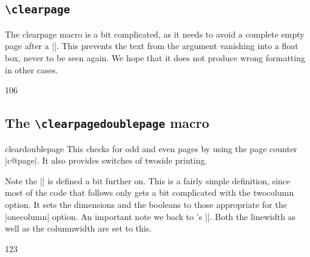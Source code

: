 \subsection{\texttt{\textbackslash clearpage}}

\begin{macro}{\clearpage}
The clearpage macro is a bit complicated, as it needs to avoid a complete empty page after a |\twocolumn[..]|. This prevents the text from the argument
vanishing into a  float box, never to be seen again. We hope that it does not
produce wrong formatting in other cases.
\end{macro}

\begin{teXXX}
106 \def\clearpage{%
107   \ifvmode
108   \ifnum \@dbltopnum =\m@ne
109     \ifdim \pagetotal <\topskip
110       \hbox{}%
111     \fi
112   \fi
113  \fi
114 \newpage
115 \write\m@ne{}%
116 \vbox{}%
117 \penalty -\@Mi
118 }
\end{teXXX}

\subsection{The \texttt{\textbackslash clearpagedoublepage} macro} 

\begin{macro}{cleardoublepage}
This checks for odd and even pages by using the
page counter |c@page|.  It also provides switches of twoside printing. 

\begin{teXXX}
\def\cleardoublepage{%
   \clearpage
   \if@twoside 
     \ifodd\c@page
     \else
       \hbox{}
       \newpage
       \if@twocolumn\hbox{}\newpage
       \fi
     \fi
  \fi}
\end{teXXX}
\end{macro}

Note the |\newpage| is defined a bit further on. This is a fairly simple definition, since most of the code that follows only gets a bit complicated with the twocolumn option. It sets the dimensions and the booleans to those appropriate for the |onecolumn| option. An important note we back to \tex's |\hsize|. Both the linewidth as well as the columnwidth are set to this.

\begin{teXXX}
123 \def\onecolumn{%
124   \clearpage
125   \global\columnwidth\textwidth
126   \global\hsize\columnwidth
127   \global\linewidth\columnwidth
128   \global\@twocolumnfalse
129   \col@number \@ne
130   \@floatplacement
     }
\end{teXXX}

